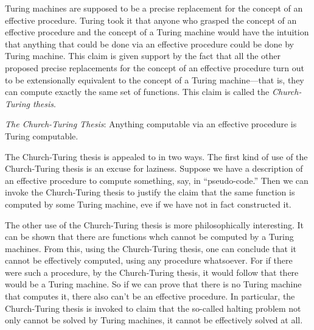 \documentclass[../../../include/open-logic-section]{subfiles}
\begin{document}

Turing machines are supposed to be a precise replacement for the
concept of an effective procedure. Turing took it that anyone who
grasped the concept of an effective procedure and the concept of a
Turing machine would have the intuition that anything that could be
done via an effective procedure could be done by Turing machine. This
claim is given support by the fact that all the other proposed precise
replacements for the concept of an effective procedure turn out to be
extensionally equivalent to the concept of a Turing machine---that is,
they can compute exactly the same set of functions. This claim is
called the \emph{Church-Turing thesis}.

\begin{defn}
\emph{The Church-Turing Thesis}: Anything computable via an effective
procedure is Turing computable.
\end{defn}

The Church-Turing thesis is appealed to in two ways.  The first kind
of use of the Church-Turing thesis is an excuse for laziness.  Suppose
we have a description of an effective procedure to compute something,
say, in ``pseudo-code.''  Then we can invoke the Church-Turing thesis
to justify the claim that the same function is computed by some Turing
machine, eve if we have not in fact constructed it.

The other use of the Church-Turing thesis is more philosophically
interesting.  It can be shown that there are functions whch cannot be
computed by a Turing machines.  From this, using the Church-Turing
thesis, one can conclude that it cannot be effectively computed, using
any procedure whatsoever.  For if there were such a procedure, by the
Church-Turing thesis, it would follow that there would be a Turing
machine.  So if we can prove that there is no Turing machine that
computes it, there also can't be an effective procedure.  In
particular, the Church-Turing thesis is invoked to claim that the
so-called halting problem not only cannot be solved by Turing
machines, it cannot be effectively solved at all.
\end{document}
